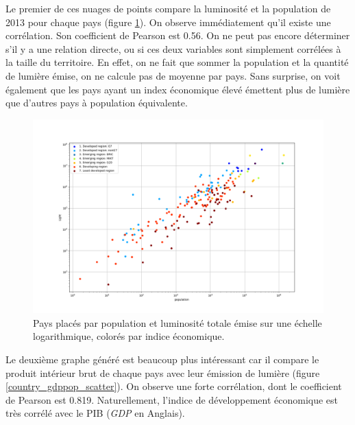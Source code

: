 \documentclass[a4paper, 11pt]{report}
\begin{document}
Le premier de ces nuages de points compare la luminosité et la population de 2013 pour chaque pays (figure \ref{country_lightpop_scatter}). On observe immédiatement qu'il existe une corrélation. Son coefficient de Pearson est 0.56. On ne peut pas encore déterminer s'il y a une relation directe, ou si ces deux variables sont simplement corrélées à la taille du territoire. En effet, on ne fait que sommer la population et la quantité de lumière émise, on ne calcule pas de moyenne par pays.
Sans surprise, on voit également que les pays ayant un index économique élevé émettent plus de lumière que d'autres pays à population équivalente.

\begin{figure}
	\centering
	\includegraphics[width=1.0\textwidth]{img/population-light.png}
	\caption{Pays placés par population et luminosité totale émise sur une échelle logarithmique, colorés par indice économique.}
	\label{country_lightpop_scatter}
\end{figure}

Le deuxième graphe généré est beaucoup plus intéressant car il compare le produit intérieur brut de chaque pays avec leur émission de lumière (figure \ref{country_gdppop_scatter}). On observe une forte corrélation, dont le coefficient de Pearson est 0.819.
Naturellement, l'indice de développement économique est très corrélé avec le PIB (\textit{GDP} en Anglais).
\end{document}
